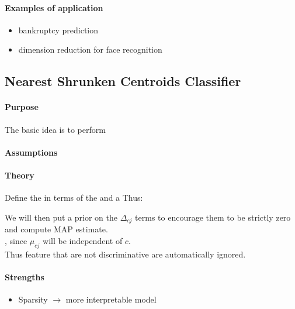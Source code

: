 \paragraph{Examples of application}
\begin{itemize}
    \item bankruptcy prediction
    \item dimension reduction for face recognition
\end{itemize}



\subsection{Nearest Shrunken Centroids Classifier}
\paragraph{Purpose}
The basic idea is to perform  
\paragraph{Assumptions}
\paragraph{Theory}
Define the  in terms of the  and a  Thus:
\begin{center}
\end{center}
We will then put a prior on the $\Delta_{cj}$ terms to encourage them to be strictly
zero and compute MAP estimate.\\
, since $\mu_{cj}$ will be independent of $c$.\\
Thus feature that are not discriminative are automatically ignored.

\paragraph{Strengths}
\begin{itemize}
    \item Sparsity $\rightarrow$ more interpretable model
\end{itemize}

